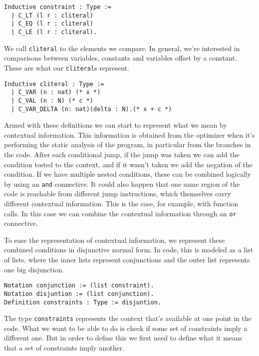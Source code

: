\begin{verbatim}
Inductive constraint : Type :=
  | C_LT (l r : cliteral)
  | C_EQ (l r : cliteral)
  | C_LE (l r : cliteral).
\end{verbatim}

We call \texttt{cliteral} to the elements we compare. In general, we're interested in comparisons between
variables, constants and variables offset by a constant. These are what our \texttt{cliteral}s represent.

\begin{verbatim}
Inductive cliteral : Type :=
  | C_VAR (n : nat) (* x *)
  | C_VAL (n : N) (* c *)
  | C_VAR_DELTA (n: nat)(delta : N).(* x + c *)
\end{verbatim}

Armed with these definitions we can start to represent what we mean by contextual information. This 
information is obtained from the optimizer when it's performing the static analysis of the program, in 
particular from the branches in the code. After each conditional jump, if the jump was taken we can add
the condition tested to the context, and if it wasn't taken we add the negation of the condition. If we have
multiple nested conditions, these can be combined logically by using an \texttt{and} connective. It could also 
happen that one same region of the code is reachable from different jump instructions, which themselves
carry different contextual information. This is the case, for example, with function calls. In this case
we can combine the contextual information through an \texttt{or} connective. 

To ease the representation of contextual information, we represent these combined conditions in disjunctive
normal form. In code, this is modeled as a list of lists, where the inner lists represent conjunctions and 
the outer list represents one big disjunction.

\begin{verbatim}
Notation conjunction := (list constraint).
Notation disjuntion := (list conjunction).
Definition constraints : Type := disjuntion.
\end{verbatim}

The type \texttt{constraints} represents the context that's available at one point in the code. What we want to
be able to do is check if some set of constraints imply a different one. But in order to define this we
first need to define what it means that a set of constraints imply another.

